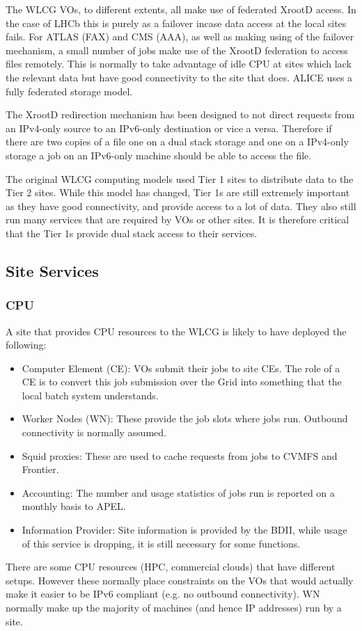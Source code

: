 \documentclass[11pt]{article}
\begin{document}
The WLCG VOs, to different extents, all make use of federated XrootD access.  In the case of LHCb this is purely as a failover incase data access at the local sites fails.  For ATLAS (FAX) and CMS (AAA), as well as making using of the failover mechanism, a small number of jobs make use of the XrootD federation to access files remotely.  This is normally to take advantage of idle CPU at sites which lack the relevant data but have good connectivity to the site that does.  ALICE uses a fully federated storage model.  

The XrootD redirection mechanism has been designed to not direct requests from an IPv4-only source to an IPv6-only destination or vice a versa.  Therefore if there are two copies of a file one on a dual stack storage and one on a IPv4-only storage a job on an IPv6-only machine should be able to access the file.

The original WLCG computing models used Tier 1 sites to distribute data to the Tier 2 sites.  While this model has changed, Tier 1s are still extremely important as they have good connectivity, and provide access to a lot of data.  They also still run many services that are required by VOs or other sites.  It is therefore critical that the Tier 1s provide dual stack access to their services. 
\subsection{Site Services}
\subsubsection{CPU}
A site that provides CPU resources to the WLCG is likely to have deployed the following:
\begin{itemize}
\item Computer Element (CE): VOs submit their jobs to site CEs.  The role of a CE is to convert this job submission over the Grid into something that the local batch system understands.
\item Worker Nodes (WN): These provide the job slots where jobs run.  Outbound connectivity is normally assumed.
\item Squid proxies: These are used to cache requests from jobs to CVMFS and Frontier.
\item Accounting: The number and usage statistics of jobs run is reported on a monthly basis to APEL.
\item Information Provider: Site information is provided by the BDII, while usage of this service is dropping, it is still necessary for some functions.
\end{itemize}
There are some CPU resources (HPC, commercial clouds) that have different setups.  However these normally place constraints on the VOs that would actually make it easier to be IPv6 compliant (e.g. no outbound connectivity).  WN normally make up the majority of machines (and hence IP addresses) run by a site.
\end{document}
